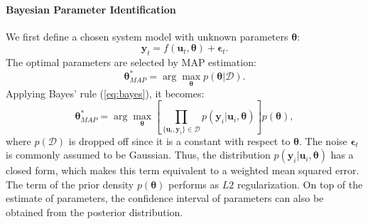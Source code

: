 \paragraph{Bayesian Parameter Identification}
We first define a chosen system model with unknown parameters $\boldsymbol{\theta}$:
\begin{equation}
    \boldsymbol{y}_t=f(\boldsymbol{u}_t, \boldsymbol{\theta})+\boldsymbol{\epsilon}_t.
\end{equation}
The optimal parameters are selected by \ac{MAP} estimation:
\begin{equation}
    \boldsymbol{\theta}^*_{MAP}=\arg \max_{\boldsymbol{\theta}}p(\boldsymbol{\theta}|\mathcal{D}).
\end{equation}
Applying Bayes' rule (\ref{eq:bayes}), it becomes:
\begin{equation}
    \boldsymbol{\theta}^*_{MAP}=\arg \max_{\boldsymbol{\theta}}[\prod_{\{\boldsymbol{u}_i,\boldsymbol{y}_i\}\in\mathcal{D}} p(\boldsymbol{y}_i|\boldsymbol{u}_i,\boldsymbol{\theta})]p(\boldsymbol{\theta}),
\end{equation}
where $p(\mathcal{D})$ is dropped off since it is a constant with respect to $\boldsymbol{\theta}$. The noise $\boldsymbol{\epsilon}_t$ is commonly assumed to be Gaussian. Thus, the distribution $p(\boldsymbol{y}_i|\boldsymbol{u}_i,\boldsymbol{\theta})$ has a closed form, which makes this term equivalent to a weighted mean squared error. The term of the prior density $p(\boldsymbol{\theta})$ performs as $L2$ regularization.
On top of the estimate of parameters, the confidence interval of parameters can also be obtained from the posterior distribution.


